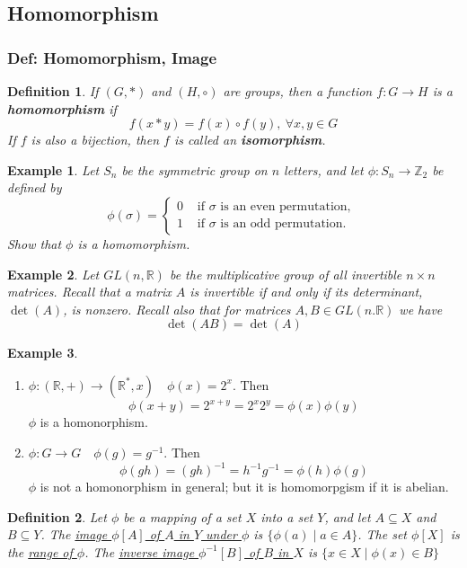 \documentclass[11pt,a4paper]{article}
\newtheorem{example}{Example}
\newtheorem{definition}{Definition}
\begin{document}
\subsection{Homomorphism}
\subsubsection{Def: Homomorphism, Image}
\begin{definition}
If $(G,*)$ and $(H,\circ)$ are groups, then a function $f:G \rightarrow	H$ is a \textbf{homomorphism} if $$f(x*y)=f(x)\circ f(y),\ \forall x,y\in G$$
If $f$ is also a bijection, then $f$ is called an \textbf{isomorphism}.
\end{definition}

\begin{example}
    Let $S_{n}$ be the symmetric group on $n$ letters, and let $\phi: S_{n} \rightarrow \mathbb{Z}_{2}$ be defined by $$\phi(\sigma)= \begin{cases}0 & \text { if } \sigma \text { is an even permutation, } \\ 1 & \text { if } \sigma \text { is an odd permutation. }\end{cases}$$
    Show that $\phi$ is a homomorphism.
\end{example}

\begin{example}
    Let $G L(n, \mathbb{R})$ be the multiplicative group of all invertible $n \times n$ matrices. Recall that a matrix $A$ is invertible if and only if its determinant, $\operatorname{det}(A)$, is nonzero. Recall also that for matrices $A, B \in G L(n . \mathbb{R})$ we have
    $$
    \operatorname{det}(A B)=\operatorname{det}(A)
    $$
\end{example}

\begin{example}
\end{example}
\begin{enumerate}
    \item $\phi: (\mathbb{R},+) \rightarrow	(\mathbb{R}^*,x)\quad \phi(x)=2^x$. Then
    $$\phi(x+y)=2^{x+y}=2^x2^y=\phi(x)\phi(y)$$ $\phi$ is a homonorphism.
    \item $\phi: G \rightarrow	G\quad \phi(g)=g^{-1}$. Then
    $$\phi(gh)=(gh)^{-1}=h^{-1}g^{-1}=\phi(h)\phi(g)$$ $\phi$ is not a homonorphism in general; but it is homomorpgism if it is abelian.
\end{enumerate}

\begin{definition}
    Let $\phi$ be a mapping of a set $X$ into a set $Y$, and let $A \subseteq X$ and $B \subseteq Y$. The \underline{image $\phi[A]$ of $A$ in $Y$ under $\phi$} is $\{\phi(a) \mid a \in A\}$. The set $\phi[X]$ is the \underline{range of $\phi$}. The \underline{inverse image $\phi^{-1}[B]$ of $B$ in $X$} is $\{x \in X \mid \phi(x) \in B\}$
\end{definition}
\end{document}

